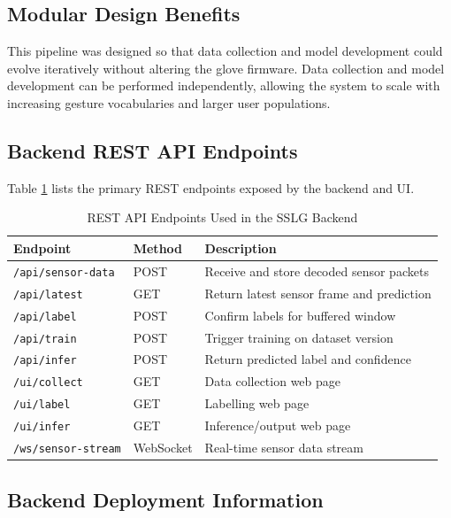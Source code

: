 \documentclass[12pt,a4paper]{report}
\begin{document}
\subsection{Modular Design Benefits}
This pipeline was designed so that data collection and model development could evolve iteratively without altering the glove firmware. Data collection and model development can be performed independently, allowing the system to scale with increasing gesture vocabularies and larger user populations.

\subsection{Backend REST API Endpoints}

Table \ref{tab:api_endpoints} lists the primary REST endpoints exposed by the backend and UI.

\begin{table}[H]
  \centering
  \caption{REST API Endpoints Used in the SSLG Backend}
  \label{tab:api_endpoints}
  \begin{tabular}{>{\raggedright\arraybackslash}p{} >{\centering\arraybackslash}p{} >{\raggedright\arraybackslash}p{}}
    \toprule
    \textbf{Endpoint} & \textbf{Method} & \textbf{Description} \\
    \midrule
    \texttt{/api/sensor-data} & POST & Receive and store decoded sensor packets \\
    \texttt{/api/latest} & GET & Return latest sensor frame and prediction \\
    \texttt{/api/label} & POST & Confirm labels for buffered window \\
    \texttt{/api/train} & POST & Trigger training on dataset version \\
    \texttt{/api/infer} & POST & Return predicted label and confidence \\
    \texttt{/ui/collect} & GET & Data collection web page \\
    \texttt{/ui/label} & GET & Labelling web page \\
    \texttt{/ui/infer} & GET & Inference/output web page \\
    \texttt{/ws/sensor-stream} & WebSocket & Real-time sensor data stream \\
    \bottomrule
  \end{tabular}
\end{table}

\subsection{Backend Deployment Information}
\end{document}
